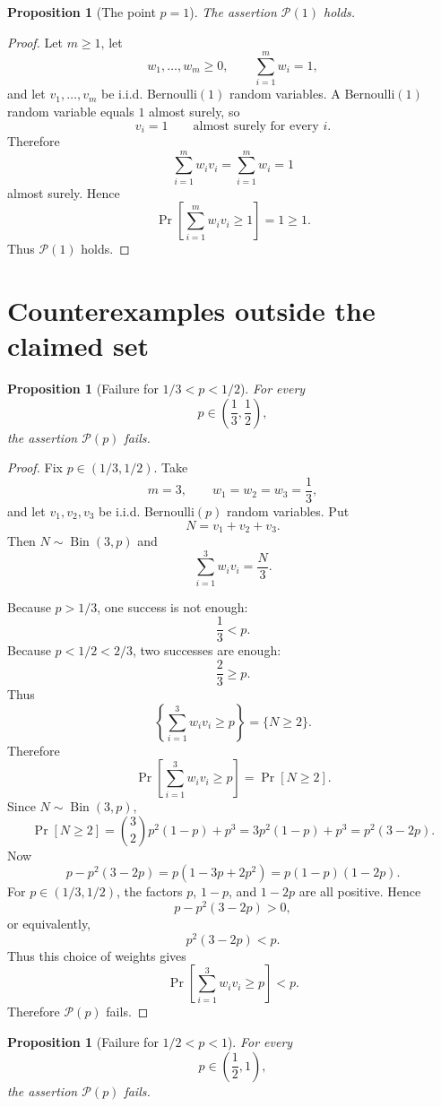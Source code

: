 \documentclass[12pt]{article}
\theoremstyle{definition}
\theoremstyle{plain}
\newtheorem{proposition}[definition]{Proposition}
\theoremstyle{remark}
\begin{document}
\begin{proposition}[The point \(p=1\)]\label{prop:onep}
The assertion \(\mathcal P(1)\) holds.
\end{proposition}

\begin{proof}
Let \(m\ge1\), let
\[
w_1,\ldots,w_m\ge0,\qquad \sum_{i=1}^{m}w_i=1,
\]
and let \(v_1,\ldots,v_m\) be i.i.d. Bernoulli\((1)\) random variables. A Bernoulli\((1)\) random variable equals \(1\) almost surely, so
\[
v_i=1\qquad\text{almost surely for every }i.
\]
Therefore
\[
\sum_{i=1}^{m}w_i v_i
=
\sum_{i=1}^{m}w_i
=
1
\]
almost surely. Hence
\[
\Pr\!\left[\sum_{i=1}^{m}w_i v_i\ge1\right]=1\ge1.
\]
Thus \(\mathcal P(1)\) holds.
\end{proof}

\section{Counterexamples outside the claimed set}

\begin{proposition}[Failure for \(1/3<p<1/2\)]\label{prop:countermiddle}
For every
\[
p\in\left(\frac13,\frac12\right),
\]
the assertion \(\mathcal P(p)\) fails.
\end{proposition}

\begin{proof}
Fix \(p\in(1/3,1/2)\). Take
\[
m=3,\qquad w_1=w_2=w_3=\frac13,
\]
and let \(v_1,v_2,v_3\) be i.i.d. Bernoulli\((p)\) random variables. Put
\[
N=v_1+v_2+v_3.
\]
Then \(N\sim\operatorname{Bin}(3,p)\) and
\[
\sum_{i=1}^{3}w_i v_i=\frac{N}{3}.
\]

Because \(p>1/3\), one success is not enough:
\[
\frac13<p.
\]
Because \(p<1/2<2/3\), two successes are enough:
\[
\frac23\ge p.
\]
Thus
\[
\left\{\sum_{i=1}^{3}w_i v_i\ge p\right\}
=
\{N\ge2\}.
\]
Therefore
\[
\Pr\!\left[\sum_{i=1}^{3}w_i v_i\ge p\right]
=
\Pr[N\ge2].
\]
Since \(N\sim\operatorname{Bin}(3,p)\),
\[
\Pr[N\ge2]
=
\binom{3}{2}p^2(1-p)+p^3
=
3p^2(1-p)+p^3
=
p^2(3-2p).
\]
Now
\[
p-p^2(3-2p)
=
p(1-3p+2p^2)
=
p(1-p)(1-2p).
\]
For \(p\in(1/3,1/2)\), the factors \(p\), \(1-p\), and \(1-2p\) are all positive. Hence
\[
p-p^2(3-2p)>0,
\]
or equivalently,
\[
p^2(3-2p)<p.
\]
Thus this choice of weights gives
\[
\Pr\!\left[\sum_{i=1}^{3}w_i v_i\ge p\right]<p.
\]
Therefore \(\mathcal P(p)\) fails.
\end{proof}

\begin{proposition}[Failure for \(1/2<p<1\)]\label{prop:counterlarge}
For every
\[
p\in\left(\frac12,1\right),
\]
the assertion \(\mathcal P(p)\) fails.
\end{proposition}
\end{document}
